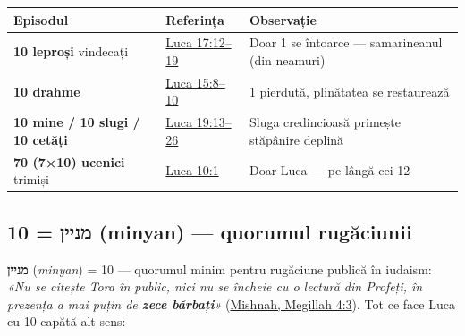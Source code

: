 \documentclass[12pt,a4paper,twoside,openany]{book}
\begin{document}
\begin{center}
\small
\begin{tabular}{L{5.0cm}L{2.1cm}L{7.8cm}}
\toprule
{}
\textbf{Episodul} & \textbf{Referința} & \textbf{Observație} \\
\midrule
\textbf{10 leproși} vindecați & \href{https://bibliaortodoxa.ro/carte.php?id=48\&cap=17\#12}{Luca 17:12–19} & Doar 1 se întoarce — samarineanul (din neamuri) \\
\textbf{10 drahme} & \href{https://bibliaortodoxa.ro/carte.php?id=48\&cap=15\#8}{Luca 15:8–10} & 1 pierdută, plinătatea se restaurează \\
\textbf{10 mine / 10 slugi / 10 cetăți} & \href{https://bibliaortodoxa.ro/carte.php?id=48\&cap=19\#13}{Luca 19:13–26} & Sluga credincioasă primește stăpânire deplină \\
\textbf{70 (7×10) ucenici} trimiși & \href{https://bibliaortodoxa.ro/carte.php?id=48\&cap=10\#1}{Luca 10:1} & Doar Luca — pe lângă cei 12 \\
\bottomrule
\end{tabular}
\end{center}
\normalsize

\subsection{10 = מניין (minyan) — quorumul rugăciunii}
\textbf{מניין} (\textit{minyan}) = 10 — quorumul minim pentru rugăciune publică în iudaism: \textit{«Nu se citește Tora în public, nici nu se încheie cu o lectură din Profeți, în prezența a mai puțin de \textbf{zece bărbați}»} (\href{https://www.sefaria.org/Mishnah_Megillah.4.3}{Mishnah, Megillah 4:3}). Tot ce face Luca cu 10 capătă alt sens:
\end{document}
